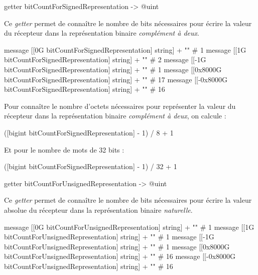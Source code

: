 
\begin{galgas3box}
getter bitCountForSignedRepresentation -> @uint
\end{galgas3box}

Ce \emph{getter} permet de connaître le nombre de bits nécessaires pour écrire la valeur du récepteur dans la représentation binaire \emph{complément à deux}.

\begin{galgas3}
message [[0G bitCountForSignedRepresentation] string] + "\n" # 1
message [[1G bitCountForSignedRepresentation] string] + "\n" # 2
message [[-1G bitCountForSignedRepresentation] string] + "\n" # 1
message [[0x8000G bitCountForSignedRepresentation] string] + "\n" # 17
message [[-0x8000G bitCountForSignedRepresentation] string] + "\n" # 16
\end{galgas3}


Pour connaître le nombre d'octets nécessaires pour représenter la valeur du récepteur dans la représentation binaire \emph{complément à deux}, on calcule :
\begin{galgas3}
([bigint bitCountForSignedRepresentation] - 1) / 8 + 1
\end{galgas3}

Et pour le nombre de mots de 32 bits :
\begin{galgas3}
([bigint bitCountForSignedRepresentation] - 1) / 32 + 1
\end{galgas3}




\begin{galgas3box}
getter bitCountForUnsignedRepresentation -> @uint
\end{galgas3box}

Ce \emph{getter} permet de connaître le nombre de bits nécessaires pour écrire la valeur absolue du récepteur dans la représentation binaire \emph{naturelle}.

\begin{galgas3}
message [[0G bitCountForUnsignedRepresentation] string] + "\n" # 1
message [[1G bitCountForUnsignedRepresentation] string] + "\n" # 1
message [[-1G bitCountForUnsignedRepresentation] string] + "\n" # 1
message [[0x8000G bitCountForUnsignedRepresentation] string] + "\n" # 16
message [[-0x8000G bitCountForUnsignedRepresentation] string] + "\n" # 16
\end{galgas3}

